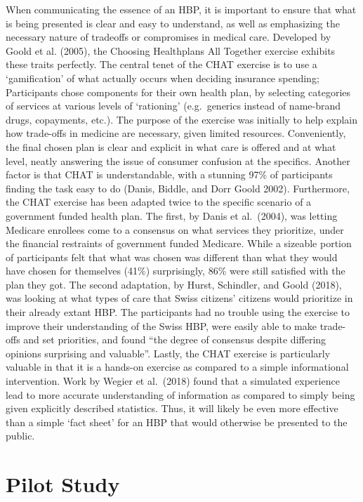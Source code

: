 \documentclass[
]{article}
\begin{document}
When communicating the essence of an HBP, it is important to ensure that
what is being presented is clear and easy to understand, as well as
emphasizing the necessary nature of tradeoffs or compromises in medical
care. Developed by Goold et al. (2005), the Choosing Healthplans All
Together exercise exhibits these traits perfectly. The central tenet of
the CHAT exercise is to use a `gamification' of what actually occurs
when deciding insurance spending; Participants chose components for
their own health plan, by selecting categories of services at various
levels of `rationing' (e.g.~generics instead of name-brand drugs,
copayments, etc.). The purpose of the exercise was initially to help
explain how trade-offs in medicine are necessary, given limited
resources. Conveniently, the final chosen plan is clear and explicit in
what care is offered and at what level, neatly answering the issue of
consumer confusion at the specifics. Another factor is that CHAT is
understandable, with a stunning 97\% of participants finding the task
easy to do (Danis, Biddle, and Dorr Goold 2002). Furthermore, the CHAT
exercise has been adapted twice to the specific scenario of a government
funded health plan. The first, by Danis et al.~(2004), was letting
Medicare enrollees come to a consensus on what services they prioritize,
under the financial restraints of government funded Medicare. While a
sizeable portion of participants felt that what was chosen was different
than what they would have chosen for themselves (41\%) surprisingly,
86\% were still satisfied with the plan they got. The second adaptation,
by Hurst, Schindler, and Goold (2018), was looking at what types of care
that Swiss citizens' citizens would prioritize in their already extant
HBP. The participants had no trouble using the exercise to improve their
understanding of the Swiss HBP, were easily able to make trade-offs and
set priorities, and found ``the degree of consensus despite differing
opinions surprising and valuable''. Lastly, the CHAT exercise is
particularly valuable in that it is a hands-on exercise as compared to a
simple informational intervention. Work by Wegier et al.~(2018) found
that a simulated experience lead to more accurate understanding of
information as compared to simply being given explicitly described
statistics. Thus, it will likely be even more effective than a simple
`fact sheet' for an HBP that would otherwise be presented to the public.

\hypertarget{pilot-study}{%
\section{Pilot Study}\label{pilot-study}}
\end{document}
